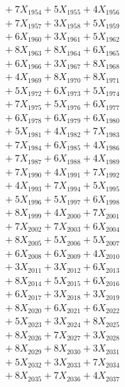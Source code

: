 \documentclass[a4paper,10pt]{article}
\begin{document}
{\begin{align}
&\;  + 7 X_{1954} + 5 X_{1955} + 4 X_{1956} \\[0.3ex]
&\;  + 7 X_{1957} + 3 X_{1958} + 5 X_{1959} \\[0.5ex]\allowbreak
&\;  + 6 X_{1960} + 3 X_{1961} + 5 X_{1962} \\[0.3ex]
&\;  + 8 X_{1963} + 8 X_{1964} + 6 X_{1965} \\[0.3ex]
&\;  + 6 X_{1966} + 3 X_{1967} + 8 X_{1968} \\[0.3ex]
&\;  + 4 X_{1969} + 8 X_{1970} + 8 X_{1971} \\[0.3ex]
&\;  + 5 X_{1972} + 6 X_{1973} + 5 X_{1974} \\[0.3ex]
&\;  + 7 X_{1975} + 5 X_{1976} + 6 X_{1977} \\[0.3ex]
&\;  + 6 X_{1978} + 6 X_{1979} + 6 X_{1980} \\[0.3ex]
&\;  + 5 X_{1981} + 4 X_{1982} + 7 X_{1983} \\[0.3ex]
&\;  + 7 X_{1984} + 6 X_{1985} + 4 X_{1986} \\[0.3ex]
&\;  + 7 X_{1987} + 6 X_{1988} + 4 X_{1989} \\[0.5ex]\allowbreak
&\;  + 7 X_{1990} + 4 X_{1991} + 7 X_{1992} \\[0.3ex]
&\;  + 4 X_{1993} + 7 X_{1994} + 5 X_{1995} \\[0.3ex]
&\;  + 5 X_{1996} + 5 X_{1997} + 6 X_{1998} \\[0.3ex]
&\;  + 8 X_{1999} + 4 X_{2000} + 7 X_{2001} \\[0.3ex]
&\;  + 7 X_{2002} + 7 X_{2003} + 6 X_{2004} \\[0.3ex]
&\;  + 8 X_{2005} + 5 X_{2006} + 5 X_{2007} \\[0.3ex]
&\;  + 6 X_{2008} + 6 X_{2009} + 4 X_{2010} \\[0.3ex]
&\;  + 3 X_{2011} + 3 X_{2012} + 6 X_{2013} \\[0.3ex]
&\;  + 8 X_{2014} + 5 X_{2015} + 6 X_{2016} \\[0.3ex]
&\;  + 6 X_{2017} + 3 X_{2018} + 3 X_{2019} \\[0.5ex]\allowbreak
&\;  + 8 X_{2020} + 6 X_{2021} + 6 X_{2022} \\[0.3ex]
&\;  + 5 X_{2023} + 3 X_{2024} + 8 X_{2025} \\[0.3ex]
&\;  + 8 X_{2026} + 7 X_{2027} + 3 X_{2028} \\[0.3ex]
&\;  + 8 X_{2029} + 8 X_{2030} + 3 X_{2031} \\[0.3ex]
&\;  + 5 X_{2032} + 3 X_{2033} + 7 X_{2034} \\[0.3ex]
&\;  + 8 X_{2035} + 7 X_{2036} + 4 X_{2037} \\[0.3ex]

\end{align}}
\end{document}
